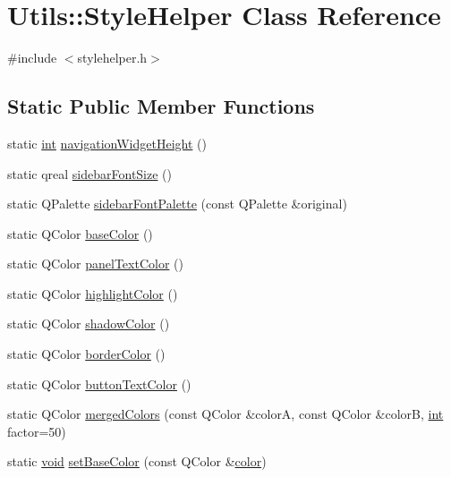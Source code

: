 \hypertarget{class_utils_1_1_style_helper}{\section{Utils\-:\-:Style\-Helper Class Reference}
\label{class_utils_1_1_style_helper}
}


{\ttfamily \#include $<$stylehelper.\-h$>$}

\subsection*{Static Public Member Functions}
\begin{DoxyCompactItemize}
\item 
static \hyperlink{ioapi_8h_a787fa3cf048117ba7123753c1e74fcd6}{int} \hyperlink{class_utils_1_1_style_helper_a23b834aa97cbfce9fa4eef57b93514a6}{navigation\-Widget\-Height} ()
\item 
static qreal \hyperlink{class_utils_1_1_style_helper_a0bd38fbc2c4fd8ec8a623db2cea918c4}{sidebar\-Font\-Size} ()
\item 
static Q\-Palette \hyperlink{class_utils_1_1_style_helper_a08c625a0478b81fc3374c2dbbaff376a}{sidebar\-Font\-Palette} (const Q\-Palette \&original)
\item 
static Q\-Color \hyperlink{class_utils_1_1_style_helper_a7d96ffba4103b4bac982826c2cb846e5}{base\-Color} ()
\item 
static Q\-Color \hyperlink{class_utils_1_1_style_helper_af7d9d75f293743dd14a2087caf3a5d56}{panel\-Text\-Color} ()
\item 
static Q\-Color \hyperlink{class_utils_1_1_style_helper_a9a504f9908e14e68eb4c55ab0d479074}{highlight\-Color} ()
\item 
static Q\-Color \hyperlink{class_utils_1_1_style_helper_a111b0bd7aa5c9f623ff12703fc300ec0}{shadow\-Color} ()
\item 
static Q\-Color \hyperlink{class_utils_1_1_style_helper_a857c029ec43ae5314d6a834f12c9a9fb}{border\-Color} ()
\item 
static Q\-Color \hyperlink{class_utils_1_1_style_helper_aa10831ed568eb03f5b4c6b0c16def7e9}{button\-Text\-Color} ()
\item 
static Q\-Color \hyperlink{class_utils_1_1_style_helper_afc6d9df6a8bf0d9d38fff4e2e8b10a58}{merged\-Colors} (const Q\-Color \&color\-A, const Q\-Color \&color\-B, \hyperlink{ioapi_8h_a787fa3cf048117ba7123753c1e74fcd6}{int} factor=50)
\item 
static \hyperlink{group___u_a_v_objects_plugin_ga444cf2ff3f0ecbe028adce838d373f5c}{void} \hyperlink{class_utils_1_1_style_helper_a81fb3b975c97e4928bceb3e9d99c76c8}{set\-Base\-Color} (const Q\-Color \&\hyperlink{glext_8h_a3ea846f998d64f079b86052b6c4193a8}{color})

\end{DoxyCompactItemize}
